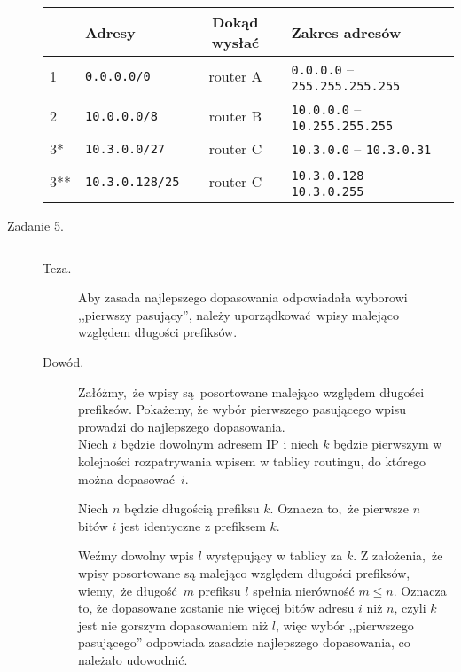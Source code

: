 \documentclass[a4paper, oneside]{article}
\begin{document}
\begin{description}
{        \begin{table}[H]
        \centering
        \begin{tabular}{|l|l|c|l|}
        \hline
            & \textbf{Adresy}     
            & \textbf{Dokąd wysłać} 
            & \textbf{Zakres adresów} \\ \hline \hline
        1   & \texttt{0.0.0.0/0}
            & \cellcolor{blue!35} router A 
            & \texttt{0.0.0.0} -- \texttt{255.255.255.255} \\ \hline
        2   & \texttt{10.0.0.0/8}
            & \cellcolor{green!35} router B
            & \texttt{10.0.0.0} -- \texttt{10.255.255.255} \\ \hline
        3*  & \texttt{10.3.0.0/27}
            & \cellcolor{red!35} router C
            & \texttt{10.3.0.0} -- \texttt{10.3.0.31} \\ \hline
        3** & \texttt{10.3.0.128/25}
            & \cellcolor{red!35} router C
            & \texttt{10.3.0.128} -- \texttt{10.3.0.255} \\ \hline
        \end{tabular}
        \end{table}
    }

    \item [Zadanie 5.]$ $

    \begin{description}
        \item [Teza.] {
            Aby zasada najlepszego dopasowania odpowiadała wyborowi ,,pierwszy
            pasujący'', należy uporządkować wpisy malejąco względem długości 
            prefiksów.
        }
        \item [Dowód.] {
            Załóżmy, że wpisy są posortowane malejąco względem długości
            prefiksów. Pokażemy, że wybór pierwszego pasującego wpisu
            prowadzi do najlepszego dopasowania.\\

            Niech $i$ będzie dowolnym adresem IP i
            niech $k$ będzie pierwszym w kolejności rozpatrywania wpisem w 
            tablicy routingu, do którego można dopasować $i$.

            Niech $n$ będzie długością prefiksu $k$. Oznacza to, że
            pierwsze $n$ bitów $i$ jest identyczne z prefiksem $k$.

            Weźmy dowolny wpis $l$ występujący w tablicy za $k$.
            Z założenia, że wpisy posortowane są malejąco względem 
            długości prefiksów, wiemy, że długość $m$ prefiksu $l$
            spełnia nierówność $m \leq n$. Oznacza to, że dopasowane
            zostanie nie więcej bitów adresu $i$ niż $n$, czyli $k$
            jest nie gorszym dopasowaniem niż $l$, więc wybór
            ,,pierwszego pasującego'' odpowiada zasadzie najlepszego
            dopasowania, co należało udowodnić.
        }
        

\end{description}
\end{description}
\end{document}

